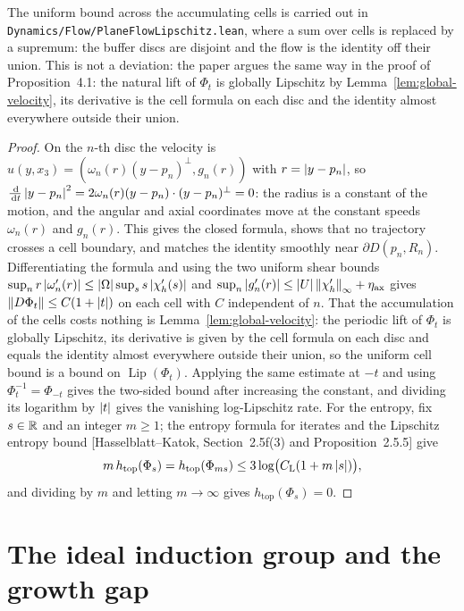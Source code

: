 The uniform bound across the accumulating cells is carried out in
\texttt{Dynamics/Flow/PlaneFlowLipschitz.lean}, where a sum over cells is replaced by a
supremum: the buffer discs are disjoint and the flow is the identity off their union.  This
is not a deviation: the paper argues the same way in the proof of Proposition~4.1: the
natural lift of $\Phi_t$ is globally Lipschitz by
Lemma~\ref{lem:global-velocity}, its derivative is the cell formula on each disc and the
identity almost everywhere outside their union.

\begin{proof}
  \leanok
  On the $n $-th disc the velocity is
  $u(y,x_3)=(\omega_n(r)(y-p_n)^\perp,g_n(r)) $ with $r=\left\lvert y-p_n\right\rvert $, so
  $\frac{\,\mathrm{d}}{\,\mathrm{d} t}\left\lvert y-p_n\right\rvert^2=2\omega_n(r)(y-p_n)\cdot(y-p_n)^\perp=0 $: the radius is
  a constant of the motion, and the angular and axial coordinates move at the constant
  speeds $\omega_n(r) $ and $g_n(r) $.  This gives the closed formula, shows that no
  trajectory crosses a cell boundary, and matches the identity smoothly near
  $\partial D(p_n,R_n) $.  Differentiating the formula and using the two uniform shear
  bounds $\sup_n r\left\lvert\omega_n'(r)\right\rvert\leq\left\lvert\Omega\right\rvert\sup_s s\left\lvert\chi_h'(s)\right\rvert $ and
  $\sup_n\left\lvert g_n'(r)\right\rvert\leq\left\lvert U\right\rvert\left\|\chi_h'\right\|_\infty+\eta_{\rm ax} $ gives
  $\left\|D\Phi_t\right\|\leq C(1+\left\lvert t\right\rvert) $ on each cell with $C $ independent of $n $.  That the
  accumulation of the cells costs nothing is Lemma~\ref{lem:global-velocity}: the periodic
  lift of $\Phi_t $ is globally Lipschitz, its derivative is given by the cell formula on
  each disc and equals the identity almost everywhere outside their union, so the uniform
  cell bound is a bound on $\operatorname{Lip}(\Phi_t) $.  Applying the same estimate at
  $-t $ and using $\Phi_t^{-1}=\Phi_{-t} $ gives the two-sided bound after increasing the
  constant, and dividing its logarithm by $\left\lvert t\right\rvert $ gives the vanishing log-Lipschitz rate.
  For the entropy, fix $s\in\mathbb{R} $ and an integer $m\geq1 $; the entropy formula for iterates
  and the Lipschitz entropy bound
  [Hasselblatt--Katok, Section~2.5f(3) and Proposition~2.5.5] give
  \[
    m\,h_{\mathrm{top}}(\Phi_s)
    =h_{\mathrm{top}}(\Phi_{ms})
    \leq3\log\bigl(C_{\rm L}(1+m\left\lvert s\right\rvert)\bigr),
  \]
  and dividing by $m $ and letting $m\to\infty $ gives $h_{\mathrm{top}}(\Phi_s)=0 $.
\end{proof}

\section{The ideal induction group and the growth gap}

